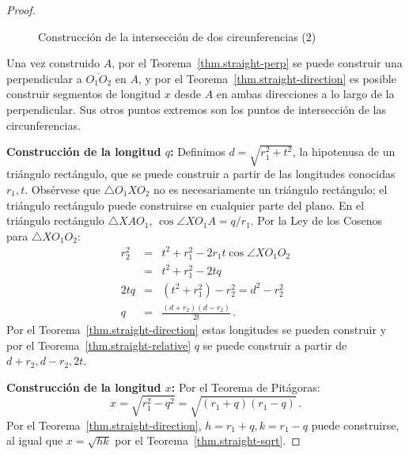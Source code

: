 \begin{proof}
\begin{figure}[b]
\begin{center}
\end{center}
\caption{Construcción de la intersección de dos circunferencias (2)}\label{f.se-circle-circle2}
\end{figure}

Una vez construido $A$, por el Teorema~\ref{thm.straight-perp} se puede construir una perpendicular a $\overline{O_1O_2}$ en $A$, y por el Teorema~\ref{thm.straight-direction} es posible construir segmentos de longitud $x$ desde $A$ en ambas direcciones a lo largo de la perpendicular. Sus otros puntos extremos son los puntos de intersección de las circunferencias.

\noindent\textbf{Construcción de la longitud $q$:} Definimos $d=\sqrt{r_1^2+t^2}$, la hipotenusa de un triángulo rectángulo, que se puede construir a partir de las longitudes conocidas $r_1,t$. Obsérvese que $\triangle O_1XO_2$ no es necesariamente un triángulo rectángulo; el triángulo rectángulo puede construirse en cualquier parte del plano. En el triángulo rectángulo $\triangle XAO_1$, $\cos\angle XO_1A=q/r_1$. Por la Ley de los Cosenos para $\triangle XO_1O_2$:
\begin{eqnarray*}
r_2^2 &=& t^2 + r_1^2 - 2r_1t\cos\angle XO_1O_2\\
&=& t^2 + r_1^2 - 2tq\\
2tq &=& (t^2+r_1^2) - r_2^2=d^2-r_2^2\\
q&=&\frac{(d+r_2)(d-r_2)}{2t}\,.
\end{eqnarray*}
Por el Teorema~\ref{thm.straight-direction} estas longitudes se pueden construir y por el Teorema~\ref{thm.straight-relative} $q$ se puede construir a partir de $d+r_2,d-r_2,2t$.

\noindent\textbf{Construcción de la longitud $x$:} Por el Teorema de Pitágoras:
\[
x=\sqrt{r_1^2-q^2}=\sqrt{(r_1+q)(r_1-q)}\,.
\]
Por el Teorema~\ref{thm.straight-direction}, $h =r_1+ q,k= r_1 - q$ puede construirse, al igual que $x=\sqrt{hk}$ por el Teorema~\ref{thm.straight-sqrt}.
\end{proof}

